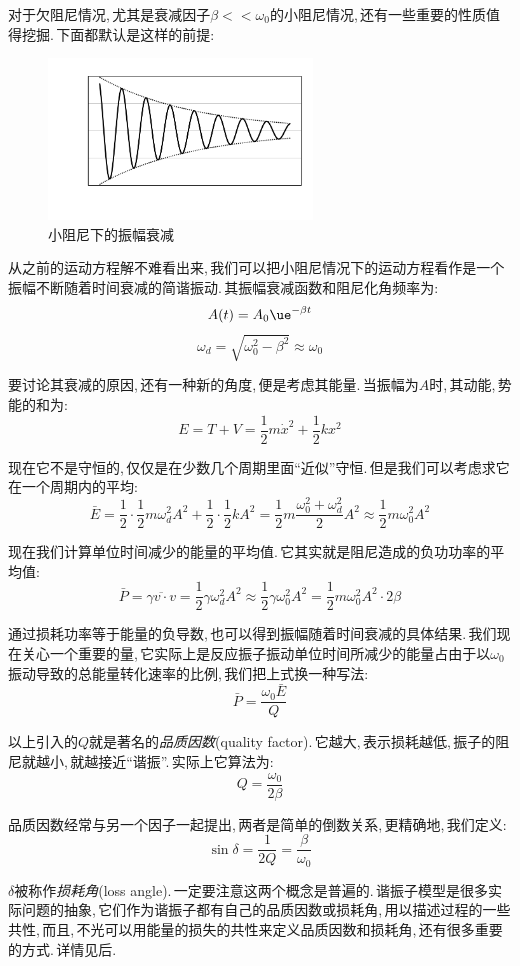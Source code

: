 对于欠阻尼情况,\,尤其是衰减因子$\beta<<\omega_0$的小阻尼情况,\,还有一些重要的性质值得挖掘.\,下面都默认是这样的前提:

\begin{figure}
\centering
\includegraphics[width=7cm]{image/6-3-2.png}
\caption{\quad 小阻尼下的振幅衰减}
\end{figure}
从之前的运动方程解不难看出来,\,我们可以把小阻尼情况下的运动方程看作是一个振幅不断随着时间衰减的简谐振动.\,其振幅衰减函数和阻尼化角频率为:
\[A(t)=A_0\ue^{-\beta t}\]
\[\omega_d=\sqrt{\omega_0^2-\beta^2}\approx \omega_0\]

要讨论其衰减的原因,\,还有一种新的角度,\,便是考虑其能量.\,当振幅为$A$时,\,其动能,\,势能的和为:
\[E=T+V=\frac{1}{2}m\dot{x}^2+\frac{1}{2}kx^2\]

现在它不是守恒的,\,仅仅是在少数几个周期里面``近似''守恒.\,但是我们可以考虑求它在一个周期内的平均:
\[\bar{E}=\frac{1}{2}\cdot\frac{1}{2}m\omega_d^2 A^2+\frac{1}{2}\cdot\frac{1}{2} kA^2=\frac{1}{2}m\frac{\omega_0^2+\omega_d^2}{2} A^2\approx \frac{1}{2}m\omega_0^2 A^2\]

现在我们计算单位时间减少的能量的平均值.\,它其实就是阻尼造成的负功功率的平均值:
\[\bar{P}=\overline{\gamma v\cdot v}=\frac{1}{2}\gamma \omega_d^2 A^2\approx \frac{1}{2}\gamma \omega_0^2 A^2=\frac{1}{2}m \omega_0^2 A^2\cdot 2\beta\]

通过损耗功率等于能量的负导数,\,也可以得到振幅随着时间衰减的具体结果.\,我们现在关心一个重要的量,\,它实际上是反应振子振动单位时间所减少的能量占由于以$\omega_0$振动导致的总能量转化速率的比例,\,我们把上式换一种写法:
\[\bar{P}=\frac{\omega_0\bar{E}}{Q}\]

以上引入的$Q$就是著名的\emph{品质因数}(quality factor).\,它越大,\,表示损耗越低,\,振子的阻尼就越小,\,就越接近``谐振''.\,实际上它算法为:
\[Q=\frac{\omega_0}{2\beta}\]

品质因数经常与另一个因子一起提出,\,两者是简单的倒数关系,\,更精确地,\,我们定义:
\[\sin\delta=\frac{1}{2Q}=\frac{\beta}{\omega_0}\]

$\delta$被称作\emph{损耗角}(loss angle).\,一定要注意这两个概念是普遍的.\,谐振子模型是很多实际问题的抽象,\,它们作为谐振子都有自己的品质因数或损耗角,\,用以描述过程的一些共性,\,而且,\,不光可以用能量的损失的共性来定义品质因数和损耗角,\,还有很多重要的方式.\,详情见后.


